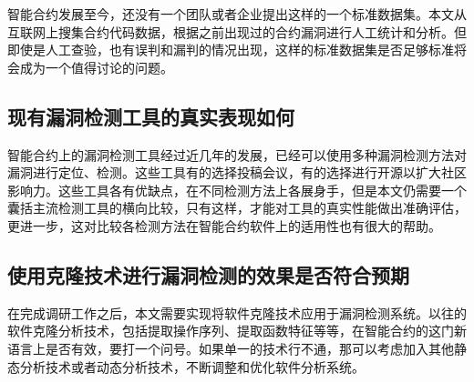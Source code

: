 智能合约发展至今，还没有一个团队或者企业提出这样的一个标准数据集。本文从互联网上搜集合约代码数据，根据之前出现过的合约漏洞进行人工统计和分析。但即使是人工查验，也有误判和漏判的情况出现，这样的标准数据集是否足够标准将会成为一个值得讨论的问题。

\subsection{现有漏洞检测工具的真实表现如何}

智能合约上的漏洞检测工具经过近几年的发展，已经可以使用多种漏洞检测方法对漏洞进行定位、检测。这些工具有的选择投稿会议，有的选择进行开源以扩大社区影响力。这些工具各有优缺点，在不同检测方法上各展身手，但是本文仍需要一个囊括主流检测工具的横向比较，只有这样，才能对工具的真实性能做出准确评估，更进一步，这对比较各检测方法在智能合约软件上的适用性也有很大的帮助。


\subsection{使用克隆技术进行漏洞检测的效果是否符合预期}

在完成调研工作之后，本文需要实现将软件克隆技术应用于漏洞检测系统。以往的软件克隆分析技术，包括提取操作序列、提取函数特征等等，在智能合约的这门新语言上是否有效，要打一个问号。如果单一的技术行不通，那可以考虑加入其他静态分析技术或者动态分析技术，不断调整和优化软件分析系统。